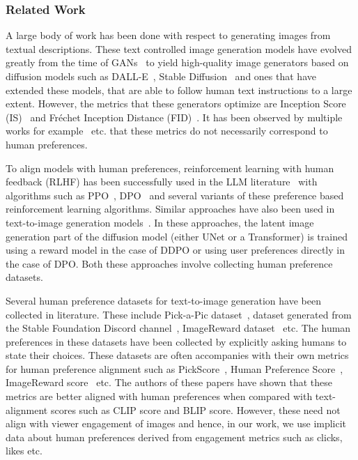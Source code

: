  





\subsubsection{Related Work}
\label{sec:related work-eoig}
A large body of work has been done with respect to generating images from textual descriptions. These text controlled image generation models have evolved greatly from the time of GANs~\cite{goodfellow2020generative} to yield high-quality image generators based on diffusion models such as DALL-E~\cite{ramesh2021zero}, Stable Diffusion~\cite{rombach2022high} and ones that have extended these models,  that are able to follow human text instructions to a large extent. However, the metrics that these generators optimize are  Inception Score (IS)~\cite{salimans2016improved} and Fr\'echet Inception Distance (FID)~\cite{heusel2017gans}. It has been observed by multiple works for example~\cite{kirstain2023pick,Wu_2023_ICCV,xu2024imagereward} etc. that these metrics do not necessarily correspond to human preferences.

To align models with human preferences, reinforcement learning with human feedback (RLHF) has been successfully used in the LLM literature~\cite{ouyang2022training,openai2023gpt4,touvron2023llama} with algorithms such as PPO~\cite{schulman2017proximal}, DPO~\cite{rafailov2024direct} and several variants of these preference based reinforcement learning algorithms. Similar approaches have also been used in text-to-image generation models~\cite{black2023training,wallace2024diffusion}. In these approaches, the latent image generation part of the diffusion model (either UNet or a Transformer) is trained using a reward model in the case of DDPO or using user preferences directly in the case of DPO. Both these approaches involve collecting human preference datasets.

Several human preference datasets for text-to-image generation have been collected in literature. These include Pick-a-Pic dataset~\cite{kirstain2023pick}, dataset generated from the Stable Foundation Discord channel~\cite{Wu_2023_ICCV}, ImageReward dataset~\cite{xu2024imagereward} etc. The human preferences in these datasets have been collected by explicitly asking humans to state their choices.  These datasets are often accompanies with their own metrics for human preference alignment such as PickScore~\cite{kirstain2023pick}, Human Preference Score~\cite{Wu_2023_ICCV}, ImageReward score~\cite{xu2024imagereward} etc. The authors of these papers have shown that these metrics are better aligned with human preferences when compared with text-alignment scores such as CLIP score and BLIP score. However, these need not align with viewer engagement of images and hence, in our work, we use implicit data about human preferences derived from engagement metrics such as clicks, likes etc.









